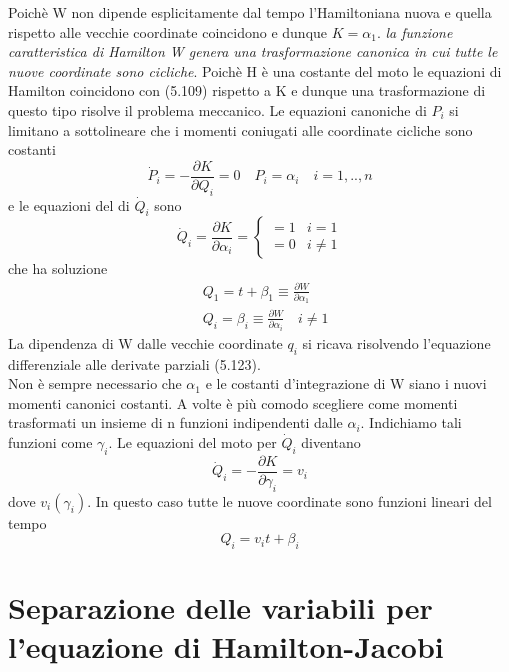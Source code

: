 Poich\`{e} W non dipende esplicitamente dal tempo l'Hamiltoniana nuova e quella rispetto alle vecchie coordinate coincidono e dunque $K = \alpha_1$. \textit{la funzione caratteristica di Hamilton W genera una trasformazione canonica in cui tutte le nuove coordinate sono cicliche}. Poich\`{e} H \`{e} una costante del moto le equazioni di Hamilton coincidono con (5.109) rispetto a K e dunque una trasformazione di questo tipo risolve il problema meccanico. 
Le equazioni canoniche di $P_i$ si limitano a sottolineare che i momenti coniugati alle coordinate cicliche sono costanti 
\begin{equation*}
	\dot{P}_i=-\frac{\partial K}{\partial Q_i}=0 \quad P_i=\alpha_i \quad i = 1,..,n
\end{equation*}
e le equazioni del di $\dot{Q}_i$ sono 
\begin{equation}
\dot{Q}_i=\frac{\partial K}{\partial \alpha_i}= \begin{cases}=1 & i=1 \\ =0 & i \neq 1\end{cases}
\end{equation}
che ha soluzione 
\begin{equation}
\begin{aligned}
& Q_1=t+\beta_1 \equiv \frac{\partial W}{\partial \alpha_1} \\[0.3in]
& Q_i=\beta_i \equiv \frac{\partial W}{\partial \alpha_i} \quad i \neq 1
\end{aligned}
\end{equation}
La dipendenza di W dalle vecchie coordinate $q_i$ si ricava risolvendo l'equazione differenziale alle derivate parziali (5.123).\newline
\\
Non \`{e} sempre necessario che $\alpha_1$ e le costanti d'integrazione di W siano i nuovi momenti canonici costanti. A volte \`{e} pi\`{u} comodo scegliere come momenti trasformati un insieme di n funzioni indipendenti dalle $\alpha_i$. Indichiamo tali funzioni come $\gamma_i$. Le equazioni del moto per $\dot{Q}_i$ diventano
\begin{equation}
	\dot{Q}_i = - \frac{\partial K}{\partial \gamma_i} = v_i
\end{equation}
dove $v_i(\gamma_i)$. In questo caso tutte le nuove coordinate sono funzioni lineari del tempo
\begin{equation}
Q_i=v_i t+\beta_i
\end{equation}

\section{Separazione delle variabili per l'equazione di Hamilton-Jacobi}

